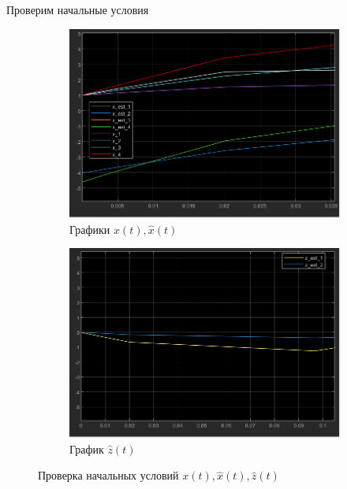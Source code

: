 \documentclass[a4paper, 12pt]{article}
\begin{document}
    \noindent Проверим начальные условия
    \begin{figure}[H]
        \centering
        \begin{subfigure}{0.45\textwidth}
            \centering
            \includegraphics[width=\linewidth]{x_0_x_est_0_task4.png}
            \caption{Графики $x(t),\hat{x}(t)$}
            \label{fig:task_4_x_0_chek}
        \end{subfigure}
        \hfill
        \begin{subfigure}{0.45\textwidth}
            \centering
            \includegraphics[width=\linewidth]{z_est_0_task4.png}
            \caption{График $\hat{z}(t)$}
            \label{fig:task_4_z_0_check}
        \end{subfigure}
        \caption{Проверка начальных условий $x(t),\hat{x}(t),\hat{z}(t)$}
        \label{fig:task_4_modeling_3}
    \end{figure}
\end{document}
